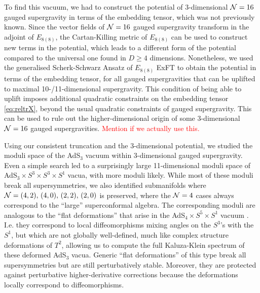 \documentclass[a4paper, 11pt]{article}
\numberwithin{equation}{section}
\newcommand{\EE}{\ensuremath{E_{8(8)}}\xspace}
\newcommand{\+}{\oplus}
\newcommand{\EM}[1]{\textcolor{red}{#1}}
\begin{document}
To find this vacuum, we had to construct the potential of 3-dimensional ${\cal N}=16$ gauged supergravity in terms of the embedding tensor, which was not previously known. Since the vector fields of ${\cal N}=16$ gauged supergravity transform in the adjoint of $\EE$, the Cartan-Killing metric of $\EE$ can be used to construct new terms in the potential, which leads to a different form of the potential compared to the universal one found in $D \geq 4$ dimensions. Nonetheless, we used the generalised Scherk-Schwarz Ansatz of $\EE$ ExFT \cite{Galli:2022idq} to obtain the potential in terms of the embedding tensor, for all gauged supergravities that can be uplifted to maximal 10-/11-dimensional supergravity. This condition of being able to uplift imposes additional quadratic constraints on the embedding tensor \eqref{eq:reltrX}, beyond the usual quadratic constraints of gauged supergravity. This can be used to rule out the higher-dimensional origin of some 3-dimensional ${\cal N}=16$ gauged supergravities. \EM{Mention if we actually use this.}

Using our consistent truncation and the 3-dimensional potential, we studied the moduli space of the AdS$_3$ vacuum within 3-dimensional gauged supergravity. Even a simple search led to a surprisingly large 11-dimensional moduli space of AdS$_3 \times S^3 \times S^3 \times S^1$ vacua, with more moduli likely. While most of these moduli break all supersymmetries, we also identified submanifolds where ${\cal N}=(4,2),\, (4,0),\, (2,2),\, (2,0)$ is preserved, where the ${\cal N}=4$ cases always correspond to the ``large'' superconformal algebra. The corresponding moduli are analogous to the  ``flat deformations'' that arise in the AdS$_4 \times S^5 \times S^1$ vacuum \cite{Guarino:2021hrc,Giambrone:2021zvp,Giambrone:2021wsm}. I.e. they correspond to local diffeomorphisms mixing angles on the $S^3$'s with the $S^1$, but which are not globally well-defined, much like complex structure deformations of $T^2$, allowing us to compute the full Kaluza-Klein spectrum of these deformed AdS$_3$ vacua. Generic ``flat deformations'' of this type break all supersymmetries but are still perturbatively stable. Moreover, they are protected against perturbative higher-derivative corrections because the deformations locally correspond to diffeomorphisms.
\end{document}
